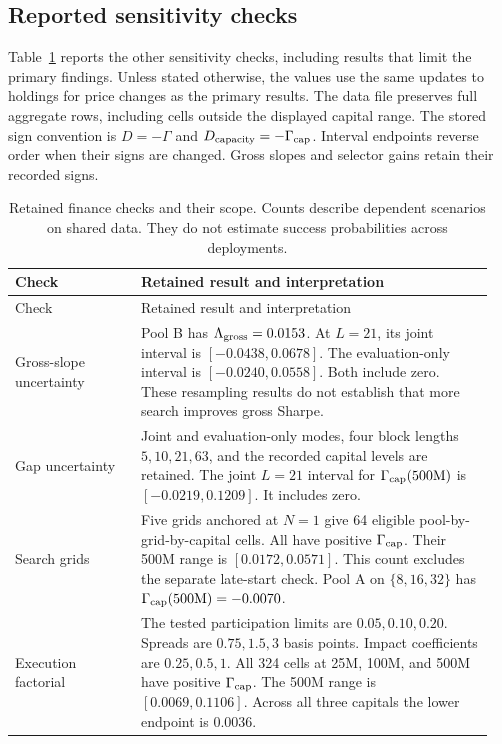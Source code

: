 \documentclass[10pt,letterpaper]{article}
\begin{document}
\subsection{Reported sensitivity checks}\label{sec:finance-inventory}
Table~\ref{tab:finance-inventory} reports the other sensitivity checks, including results that limit the primary findings. Unless stated otherwise, the values use the same updates to holdings for price changes as the primary results. The data file preserves full aggregate rows, including cells outside the displayed capital range. The stored sign convention is $D=-\Gamma$ and $D_{\rm capacity}=-\Gamma_{\rm cap}$. Interval endpoints reverse order when their signs are changed. Gross slopes and selector gains retain their recorded signs.

\begin{longtable}{@{}p{0.25\linewidth}p{0.70\linewidth}@{}}
\caption{Retained finance checks and their scope. Counts describe dependent scenarios on shared data. They do not estimate success probabilities across deployments.}\label{tab:finance-inventory}\\
\toprule
Check & Retained result and interpretation\\
\midrule
\endfirsthead
\toprule
Check & Retained result and interpretation\\
\midrule
\endhead
Gross-slope uncertainty & Pool B has $\Lambda_{\rm gross}=0.0153$. At $L=21$, its joint interval is $[-0.0438,0.0678]$. The evaluation-only interval is $[-0.0240,0.0558]$. Both include zero. These resampling results do not establish that more search improves gross Sharpe.\\
Gap uncertainty & Joint and evaluation-only modes, four block lengths $5,10,21,63$, and the recorded capital levels are retained. The joint $L=21$ interval for $\Gamma_{\rm cap}(500\mathrm{M})$ is $[-0.0219,0.1209]$. It includes zero.\\
Search grids & Five grids anchored at $N=1$ give 64 eligible pool-by-grid-by-capital cells. All have positive $\Gamma_{\rm cap}$. Their 500M range is $[0.0172,0.0571]$. This count excludes the separate late-start check. Pool A on $\{8,16,32\}$ has $\Gamma_{\rm cap}(500\mathrm{M})=-0.0070$.\\
Execution factorial & The tested participation limits are $0.05,0.10,0.20$. Spreads are $0.75,1.5,3$ basis points. Impact coefficients are $0.25,0.5,1$. All 324 cells at 25M, 100M, and 500M have positive $\Gamma_{\rm cap}$. The 500M range is $[0.0069,0.1106]$. Across all three capitals the lower endpoint is $0.0036$.\\

\end{longtable}
\end{document}
